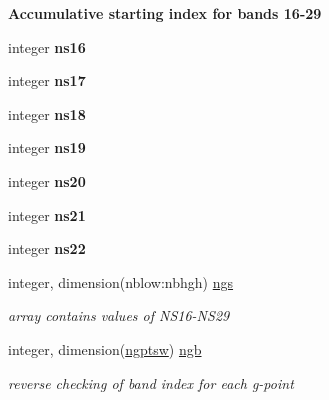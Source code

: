 \begin{Indent}\textbf{ Accumulative starting index for bands 16-\/29}\par
\begin{DoxyCompactItemize}
\item 
\mbox{\label{namespacemodule__radsw__parameters_a3e6e310ecc531e2d0db52864468dc4a7}} 
integer {\bfseries ns16}
\item 
\mbox{\label{namespacemodule__radsw__parameters_a08303e69e406f6bb2af252b1b7dff272}} 
integer {\bfseries ns17}
\item 
\mbox{\label{namespacemodule__radsw__parameters_a142f7aa9f12272d721cfeae2855eec49}} 
integer {\bfseries ns18}
\item 
\mbox{\label{namespacemodule__radsw__parameters_ab666e8da69b308ae5b09e187b8153518}} 
integer {\bfseries ns19}
\item 
\mbox{\label{namespacemodule__radsw__parameters_ad63ddbb0abcaeda56220a624a62a7336}} 
integer {\bfseries ns20}
\item 
\mbox{\label{namespacemodule__radsw__parameters_a63b1d13965acda2c131123f67fe456ea}} 
integer {\bfseries ns21}
\item 
\mbox{\label{namespacemodule__radsw__parameters_a194fffaa7b04c97d8133a9e5686e94d5}} 
integer {\bfseries ns22}
\item 
\mbox{\label{namespacemodule__radsw__parameters_a715ab3195493dff0639da443c21e4fb5}} 
integer, dimension(nblow\+:nbhgh) \hyperlink{namespacemodule__radsw__parameters_a715ab3195493dff0639da443c21e4fb5}{ngs}
\begin{DoxyCompactList}\small\item\em array contains values of N\+S16-\/\+N\+S29 \end{DoxyCompactList}\item 
\mbox{\label{namespacemodule__radsw__parameters_afdd8496d7eaa017f7f1e08e998945c1e}} 
integer, dimension(\hyperlink{namespacemodule__radsw__parameters_adc3e4d5a848d50e2883e05c62f61bc97}{ngptsw}) \hyperlink{namespacemodule__radsw__parameters_afdd8496d7eaa017f7f1e08e998945c1e}{ngb}
\begin{DoxyCompactList}\small\item\em reverse checking of band index for each g-\/point \end{DoxyCompactList}\end{DoxyCompactItemize}
\end{Indent}
